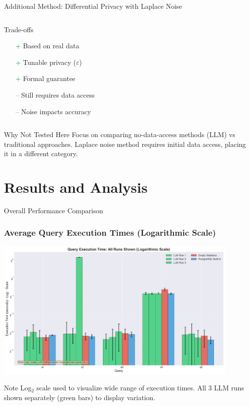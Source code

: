 \documentclass[smaller]{beamer}
\begin{document}
\begin{frame}{Additional Method: Differential Privacy with Laplace Noise}
\begin{columns}[T]
\begin{column}{0.5\textwidth}
\begin{alertblock}{Trade-offs}
\begin{itemize}
    \item[\textcolor{green}{+}] Based on real data
    \item[\textcolor{green}{+}] Tunable privacy ($\varepsilon$)
    \item[\textcolor{green}{+}] Formal guarantee
    \item[\textcolor{red}{--}] Still requires data access
    \item[\textcolor{red}{--}] Noise impacts accuracy
\end{itemize}
\end{alertblock}
\end{column}
\end{columns}

\vspace{0.3cm}

\begin{block}{Why Not Tested Here}
Focus on comparing no-data-access methods (LLM) vs traditional approaches. Laplace noise method requires initial data access, placing it in a different category.
\end{block}

\end{frame}

\section{Results and Analysis}

\begin{frame}{Overall Performance Comparison}
\frametitle{Average Query Execution Times (Logarithmic Scale)}

\begin{center}
\includegraphics[width=0.9\textwidth]{images/execution_time_comparison.png}
\end{center}

\begin{alertblock}{Note}
Log$_2$ scale used to visualize wide range of execution times. All 3 LLM runs shown separately (green bars) to display variation.
\end{alertblock}

\end{frame}
\end{document}
